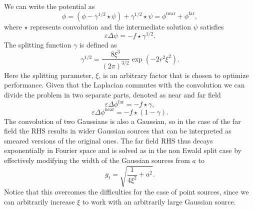 \documentclass[twoside,openright,titlepage,numbers=noenddot,%
headinclude,footinclude,cleardoublepage=empty,abstract=on,
BCOR=5mm,fontsize=11pt, dvipsnames, paper=b5
]{scrreprt}
\newcommand{\near}{\textrm{near}}
\newcommand{\far}{\textrm{far}}
\begin{document}
We can write the potential as
\begin{equation}
 \phi=(\phi - \gamma^{1/2}\star\psi) + \gamma^{1/2}\star\psi = \phi^{\near} + \phi^{\far},
\end{equation}
where $\star$ represents convolution and the intermediate solution $\psi$ satisfies
 \begin{equation}
 \varepsilon\Delta\psi=-f\star\gamma^{1/2}.
\end{equation}   
The splitting function $\gamma$ is defined as
 \begin{equation}
 \gamma^{1/2} = \frac{8\xi^3}{(2\pi)^{3/2}}\exp\left(-2r^2\xi^2\right).
\end{equation}
Here the splitting parameter, $\xi$, is an arbitrary factor that is chosen to optimize performance. 
Given that the Laplacian commutes with the convolution we can divide the problem in two separate parts, denoted as near and far field  
 \begin{equation}
 \varepsilon\Delta\phi^{\far}=-f\star\gamma,
\end{equation}   
\begin{equation}
 \label{tppoisson_ewald_near}
 \varepsilon\Delta\phi^{\near}=-f\star(1-\gamma).
\end{equation}   
The convolution of two Gaussians is also a Gaussian, so in the case of the far field the RHS results in wider Gaussian sources that can be interpreted as smeared versions of the original ones. The far field RHS thus decays exponentially in Fourier space and is solved as in the non Ewald split case by effectively modifying the width of the Gaussian sources from $a$ to
\begin{equation}
  g_t = \sqrt{\frac{1}{4\xi^2} + a^2}.
\end{equation}
Notice that this overcomes the difficulties for the case of point sources, since we can arbitrarily increase $\xi$ to work with an arbitrarily large Gaussian source.
\end{document}

